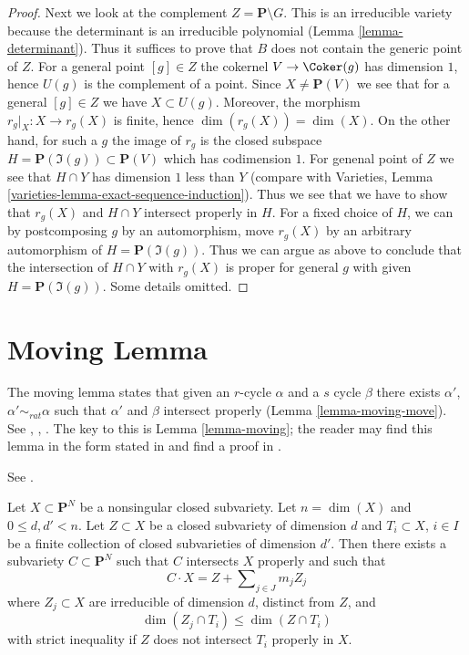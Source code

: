 \begin{proof}
\medskip\noindent
Next we look at the complement $Z = \mathbf{P} \setminus G$.
This is an irreducible variety because the determinant is an
irreducible polynomial (Lemma \ref{lemma-determinant}).
Thus it suffices to prove that $B$ does not contain the
generic point of $Z$. For a general point $[g] \in Z$
the cokernel $V \to \Coker(g)$ has dimension $1$, hence
$U(g)$ is the complement of a point. Since $X \not = \mathbf{P}(V)$
we see that for a general $[g] \in Z$ we have $X \subset U(g)$.
Moreover, the morphism $r_g|_X : X \to r_g(X)$ is finite, hence
$\dim(r_g(X)) = \dim(X)$.
On the other hand, for such a $g$ the image of $r_g$ is the
closed subspace $H = \mathbf{P}(\Im(g)) \subset \mathbf{P}(V)$
which has codimension $1$.
For genenal point of $Z$ we see that $H \cap Y$ has dimension $1$
less than $Y$ (compare with
Varieties, Lemma \ref{varieties-lemma-exact-sequence-induction}).
Thus we see that we have to show that $r_g(X)$ and $H \cap Y$
intersect properly in $H$. For a fixed choice of $H$, we can
by postcomposing $g$ by an automorphism, move $r_g(X)$ by
an arbitrary automorphism of $H = \mathbf{P}(\Im(g))$.
Thus we can argue as above to conclude that the intersection
of $H \cap Y$ with $r_g(X)$ is proper for general $g$ with given
$H = \mathbf{P}(\Im(g))$. Some details omitted.
\end{proof}







\section{Moving Lemma}
\label{section-moving-lemma}

\noindent
The moving lemma states that given an $r$-cycle $\alpha$ and a $s$ cycle
$\beta$ there exists $\alpha'$, $\alpha' \sim_{rat} \alpha$ such that
$\alpha'$ and $\beta$ intersect properly (Lemma \ref{lemma-moving-move}).
See \cite{Samuel}, \cite{ChevalleyI}, \cite{ChevalleyII}.
The key to this is Lemma \ref{lemma-moving}; the reader may find
this lemma in the form stated in
\cite[Example 11.4.1]{F} and find a proof in \cite{Roberts}.

\begin{lemma}
\label{lemma-moving}
\begin{reference}
See \cite{Roberts}.
\end{reference}
Let $X \subset \mathbf{P}^N$ be a nonsingular closed subvariety.
Let $n = \dim(X)$ and $0 \leq d, d' < n$. Let $Z \subset X$ be a closed
subvariety of dimension $d$ and $T_i \subset X$, $i \in I$ be a finite
collection of closed subvarieties of dimension $d'$. Then there exists
a subvariety $C \subset \mathbf{P}^N$ such that $C$ intersects $X$
properly and such that
$$
C \cdot X = Z + \sum\nolimits_{j \in J} m_j Z_j
$$
where $Z_j \subset X$ are irreducible of dimension $d$, distinct from $Z$, and
$$
\dim(Z_j \cap T_i) \leq \dim(Z \cap T_i)
$$
with strict inequality if $Z$ does not intersect $T_i$ properly in $X$.
\end{lemma}

